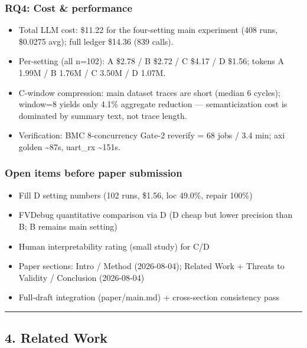\documentclass[
  11pt,
]{article}
\providecommand{\tightlist}{%
  \setlength{\itemsep}{0pt}\setlength{\parskip}{0pt}}
\begin{document}
\subsubsection{RQ4: Cost \& performance}\label{rq4-cost-performance}

\begin{itemize}
\tightlist
\item
  Total LLM cost: \$11.22 for the four-setting main experiment (408 runs, \$0.0275 avg); full ledger \$14.36 (839 calls).
\item
  Per-setting (all n=102): A \$2.78 / B \$2.72 / C \$4.17 / D \$1.56; tokens A 1.99M / B 1.76M / C 3.50M / D 1.07M.
\item
  C-window compression: main dataset traces are short (median 6 cycles); window=8 yields only 4.1\% aggregate reduction --- semanticization cost is dominated by summary text, not trace length.
\item
  Verification: BMC 8-concurrency Gate-2 reverify = 68 jobs / 3.4 min; axi golden \textasciitilde87s, uart\_rx \textasciitilde151s.
\end{itemize}

\subsubsection{Open items before paper submission}\label{open-items-before-paper-submission}

\begin{itemize}
\tightlist
\item[$\boxtimes$]
  Fill D setting numbers (102 runs, \$1.56, loc 49.0\%, repair 100\%)
\item[$\boxtimes$]
  FVDebug quantitative comparison via D (D cheap but lower precision than B; B remains main setting)
\item[$\square$]
  Human interpretability rating (small study) for C/D
\item[$\boxtimes$]
  Paper sections: Intro / Method (2026-08-04); Related Work + Threats to Validity / Conclusion (2026-08-04)
\item[$\square$]
  Full-draft integration (paper/main.md) + cross-section consistency pass
\end{itemize}

\begin{center}\rule{0.5\linewidth}{0.5pt}\end{center}

\subsection{4. Related Work}\label{related-work}
\end{document}
